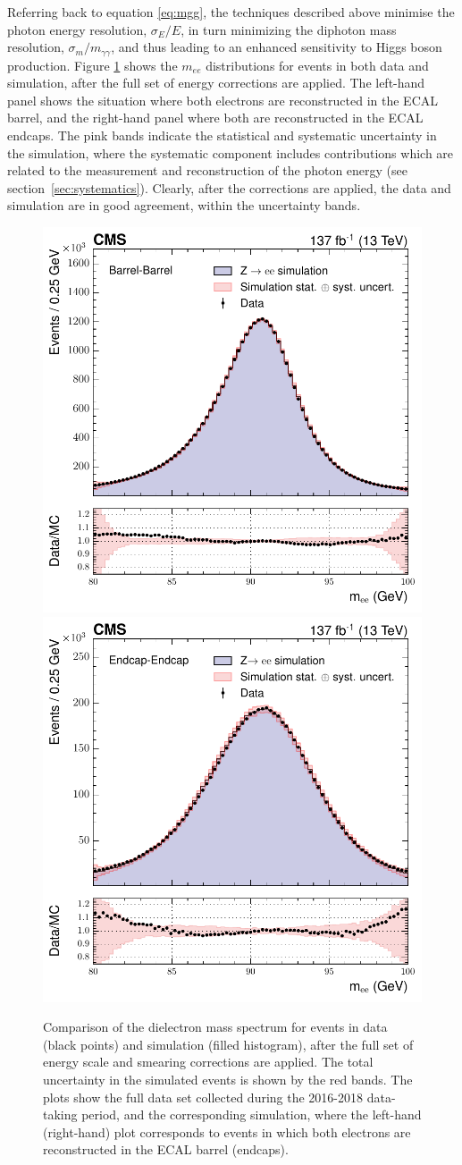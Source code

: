 Referring back to equation \ref{eq:mgg}, the techniques described above minimise the photon energy resolution, $\sigma_E/E$, in turn minimizing the diphoton mass resolution, $\sigma_m/m_{\gamma\gamma}$, and thus leading to an enhanced sensitivity to Higgs boson production. Figure \ref{fig:photon_energy_0} shows the $m_{ee}$ distributions for \Zee events in both data and simulation, after the full set of energy corrections are applied. The left-hand panel shows the situation where both electrons are reconstructed in the ECAL barrel, and the right-hand panel where both are reconstructed in the ECAL endcaps. The pink bands indicate the statistical and systematic uncertainty in the simulation, where the systematic component includes contributions which are related to the measurement and reconstruction of the photon energy (see section~\ref{sec:systematics}). Clearly, after the corrections are applied, the data and simulation are in good agreement, within the uncertainty bands.

\begin{figure}[hptb]
  \centering
  \includegraphics[width=.49\textwidth]{Figures/hgg_overview/money_run2_EbEb_inclusive.pdf}
  \includegraphics[width=.49\textwidth]{Figures/hgg_overview/money_run2_EeEe_inclusive.pdf}
  \caption[Dielectron mass spectrum for \Zee events in data and simulation after the energy corrections are applied]
  {
    Comparison of the dielectron mass spectrum for \Zee events in data (black points) and simulation (filled histogram), after the full set of energy scale and smearing corrections are applied. The total uncertainty in the simulated events is shown by the red bands. The plots show the full data set collected during the 2016-2018 data-taking period, and the corresponding simulation, where the left-hand (right-hand) plot corresponds to events in which both electrons are reconstructed in the ECAL barrel (endcaps).
  }
  \label{fig:photon_energy_0}
\end{figure}

